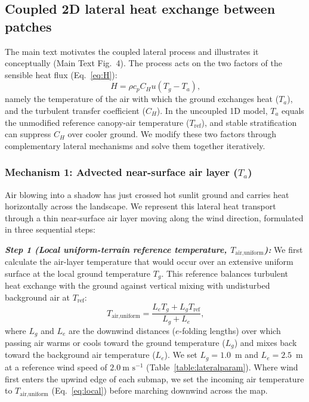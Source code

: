 \documentclass[12pt]{article}
\begin{document}
\subsection{Coupled 2D lateral heat exchange between patches}

\noindent The main text motivates the coupled lateral process and illustrates it conceptually (Main Text Fig.~4). The process acts on the two factors of the sensible heat flux (Eq.~\ref{eq:H}):
\begin{equation} \label{eq:H_lateral}
H = \rho c_p C_H u \left( T_g - T_a \right)\textrm{,}
\end{equation}
namely the temperature of the air with which the ground exchanges heat ($T_a$), and the turbulent transfer coefficient ($C_H$). In the uncoupled 1D model, $T_a$ equals the unmodified reference canopy-air temperature ($T_{\textrm{ref}}$), and stable stratification can suppress $C_H$ over cooler ground. We modify these two factors through complementary lateral mechanisms and solve them together iteratively.

\subsubsection{Mechanism 1: Advected near-surface air layer (\texorpdfstring{$T_a$}{Ta})}

\noindent Air blowing into a shadow has just crossed hot sunlit ground and carries heat horizontally across the landscape. We represent this lateral heat transport through a thin near-surface air layer moving along the wind direction, formulated in three sequential steps:

\vspace{0.6ex}
\noindent\textbf{\textit{Step 1 (Local uniform-terrain reference temperature, $T_{\textrm{air,uniform}}$):}}
We first calculate the air-layer temperature that would occur over an extensive uniform surface at the local ground temperature $T_g$. This reference balances turbulent heat exchange with the ground against vertical mixing with undisturbed background air at $T_{\textrm{ref}}$:
\begin{equation} \label{eq:local}
T_{\textrm{air,uniform}} = \frac{L_e T_g + L_g T_{\textrm{ref}}}{L_g + L_e}\textrm{,}
\end{equation}
\noindent where $L_g$ and $L_e$ are the downwind distances ($e$-folding lengths) over which passing air warms or cools toward the ground temperature ($L_g$) and mixes back toward the background air temperature ($L_e$). We set $L_g = 1.0$~m and $L_e = 2.5$~m at a reference wind speed of $2.0~\textrm{m s}^{-1}$ (Table~\ref{table:lateralparam}). Where wind first enters the upwind edge of each submap, we set the incoming air temperature to $T_{\textrm{air,uniform}}$ (Eq.~\ref{eq:local}) before marching downwind across the map.
\end{document}
